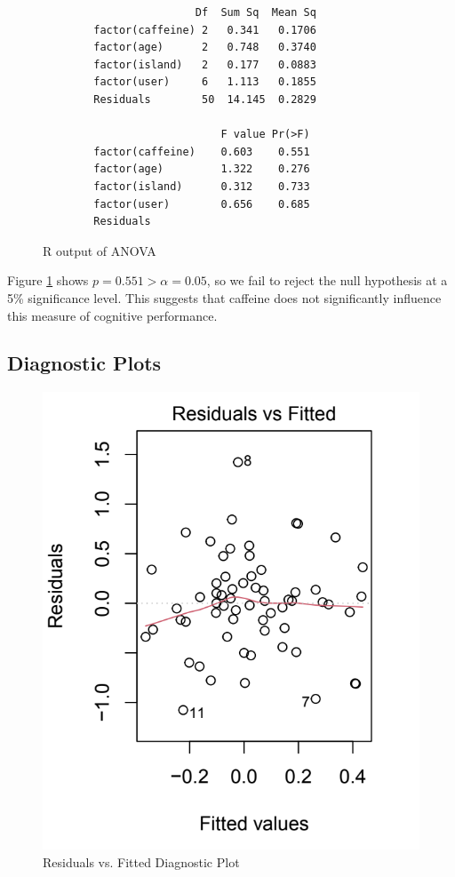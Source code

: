 \documentclass[11pt,a4paper,twoside]{tau-book}
\begin{document}
\begin{figure}[H]
        \centering
        \begin{verbatim}
                        Df  Sum Sq  Mean Sq  
        factor(caffeine) 2   0.341   0.1706  
        factor(age)      2   0.748   0.3740    
        factor(island)   2   0.177   0.0883  
        factor(user)     6   1.113   0.1855   
        Residuals        50  14.145  0.2829
        
                            F value Pr(>F)
        factor(caffeine)    0.603    0.551
        factor(age)         1.322    0.276
        factor(island)      0.312    0.733
        factor(user)        0.656    0.685
        Residuals
        \end{verbatim}
        \caption{R output of ANOVA}
        \label{fig:cognitive}
\end{figure}
Figure \ref{fig:cognitive} shows $p = 0.551 > \alpha = 0.05$, so we fail to reject the null hypothesis at a 5\% significance level. This suggests that caffeine does not significantly influence this measure of cognitive performance.

\subsection{Diagnostic Plots}
\begin{figure}[H]
        \centering
        \includegraphics[width=0.8\columnwidth]{Figures/diagnostic_fitted.png}
        \caption{Residuals vs. Fitted Diagnostic Plot}
        \label{fig:diagnostic_fitted}
\end{figure}
\end{document}
